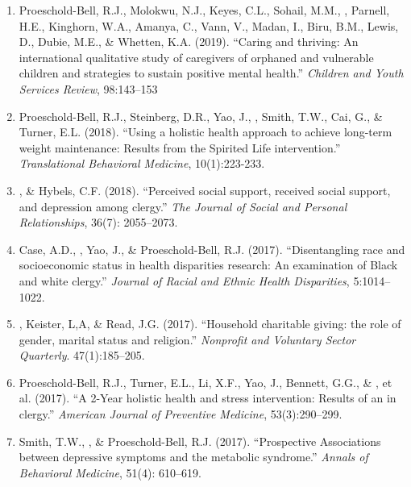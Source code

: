 \begin{enumerate}
\item Proeschold-Bell, R.J., Molokwu, N.J., Keyes, C.L., Sohail, M.M., \Eagle, Parnell, H.E., Kinghorn, W.A., Amanya, C., Vann, V., Madan, I., Biru, B.M., Lewis, D., Dubie, M.E., \& Whetten, K.A. (2019). ``Caring and thriving: An international qualitative study of caregivers of orphaned and vulnerable children and strategies to sustain positive mental health.''  \emph{Children and Youth Services Review}, 98:143--153  

\item Proeschold-Bell, R.J., Steinberg, D.R., Yao, J., \Eagle, Smith, T.W., Cai, G., \& Turner, E.L. (2018). ``Using a holistic health approach to achieve long-term weight maintenance: Results from the Spirited Life intervention.'' \emph{Translational Behavioral Medicine}, 10(1):223-233. 

\item \Eagle, \& Hybels, C.F. (2018). ``Perceived social support, received social support, and depression among clergy.'' \emph{The Journal of Social and Personal Relationships}, 36(7): 2055--2073. 

\item Case, A.D., \Eagle, Yao, J., \& Proeschold-Bell, R.J. (2017). ``Disentangling race and socioeconomic status in health disparities research: An examination of Black and white clergy.'' \emph{Journal of Racial and Ethnic Health Disparities}, 5:1014--1022. 

\item \Eagle, Keister, L,A, \& Read, J.G. (2017). ``Household charitable giving: the role of gender, marital status and religion.'' \emph{Nonprofit and Voluntary Sector Quarterly}. 47(1):185--205. 

\item Proeschold-Bell, R.J., Turner, E.L., Li, X.F., Yao, J., Bennett, G.G., \& \Eagle, et al. (2017). ``A 2-Year holistic health and stress intervention: Results of an  in clergy.'' \emph{American Journal of Preventive Medicine}, 53(3):290--299. 

\item Smith, T.W., \Eagle\CF, \& Proeschold-Bell, R.J. (2017). ``Prospective Associations between depressive symptoms and the metabolic syndrome.'' \emph{Annals of Behavioral Medicine}, 51(4): 610--619. 


\end{enumerate}
